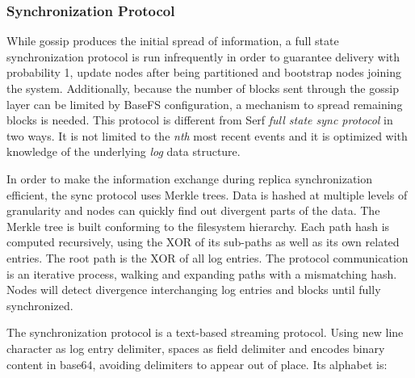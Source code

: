 \documentclass{sig-alternate}
\begin{document}
\subsubsection{Synchronization Protocol}

While gossip produces the initial spread of information, a full state synchronization protocol is run infrequently in order to guarantee delivery with probability 1, update nodes after being partitioned and bootstrap nodes joining the system. Additionally, because the number of blocks sent through the gossip layer can be limited by BaseFS configuration, a mechanism to spread remaining blocks is needed. This protocol is different from Serf \textit{full state sync protocol} in two ways. It is not limited to the \textit{nth} most recent events and it is optimized with knowledge of the underlying \textit{log} data structure.

In order to make the information exchange during replica synchronization efficient, the sync protocol uses Merkle trees. Data is hashed at multiple levels of granularity and nodes can quickly find out divergent parts of the data. The Merkle tree is built conforming to the filesystem hierarchy. Each path hash is computed recursively, using the XOR of its sub-paths as well as its own related entries. The root path is the XOR of all log entries. The protocol communication is an iterative process, walking and expanding paths with a mismatching hash. Nodes will detect divergence interchanging log entries and blocks until fully synchronized. 

The synchronization protocol is a text-based streaming protocol. Using new line character as log entry delimiter, spaces as field delimiter and encodes binary content in base64, avoiding delimiters to appear out of place. Its alphabet is:
\end{document}
